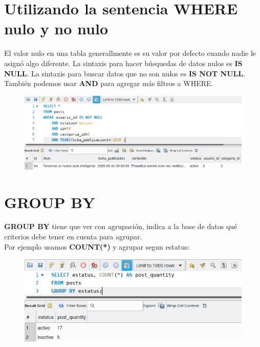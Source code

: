 \documentclass{article}
\begin{document}
\section{Utilizando la sentencia WHERE nulo y no nulo}%
El valor nulo en una tabla generallmente es su valor por defecto cuando nadie
le asignó algo diferente. La sintaxis para hacer búsquedas de datos nulos es
\textbf{IS NULL}. La sintaxis para buscar datos que no son nulos es \textbf{IS
NOT NULL}. También podemos usar \textbf{AND} para agregar más filtros a WHERE.

\begin{figure}[h!]
  \centering
  \includegraphics[scale=0.75]{./Pictures/117_where_and.png}
\end{figure}

\section{GROUP BY}%
\textbf{GROUP BY} tiene que ver con agrupación, indica a la base de datos qué
criterios debe tener en cuenta para agrupar.\\

Por ejemplo usamos \textbf{COUNT(*)} y agrupar segun estatus:\\
\begin{figure}[h!]
  \centering
  \includegraphics[scale=0.75]{./Pictures/118_group_by.png}
\end{figure}
\end{document}
